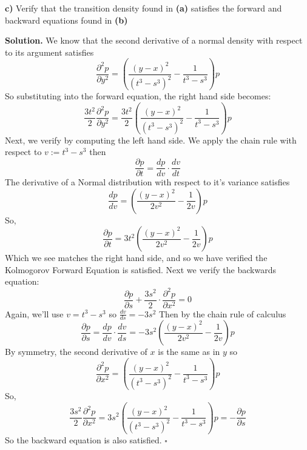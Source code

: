 \documentclass{article}
\begin{document}
\begin{tcolorbox}
[colframe=black,colback=gray!5,boxrule=0.5pt]
    \textbf{c)} Verify that the transition density found in \textbf{(a)} satisfies the forward and backward equations found in \textbf{(b)}
\end{tcolorbox}
\textbf{Solution.} We know that the second derivative of a normal density with respect to its argument satisfies 
$$\frac{\partial^2 p}{\partial y^2} = \left(\frac{(y-x)^2}{(t^3-s^3)^2} - \frac{1}{t^3 - s^3}\right)p$$
So substituting into the forward equation, the right hand side becomes:  
$$\frac{3t^2}{2} \frac{\partial^2 p}{\partial y^2} = \frac{3t^2}{2}\left(\frac{(y-x)^2}{(t^3-s^3)^2} - \frac{1}{t^3 - s^3}\right)p$$
Next, we verify by computing the left hand side. We apply the chain rule with respect to $v:=t^3-s^3$ then 
$$\frac{\partial p}{\partial t} = \frac{dp}{dv}\cdot \frac{dv}{dt}$$
The derivative of a Normal distribution with respect to it's variance satisfies 
$$\frac{dp}{dv} = \left(\frac{(y-x)^2}{2v^2} - \frac{1}{2v}\right)p$$
So,
$$\frac{\partial p}{\partial t} = 3t^2\left(\frac{(y-x)^2}{2v^2} - \frac{1}{2v}\right)p$$
Which we see matches the right hand side, and so we have verified the Kolmogorov Forward Equation is satisfied. Next we verify the backwards equation: 
$$\frac{\partial p}{\partial s} + \frac{3s^2}{2}\cdot \frac{\partial^2 p}{\partial x^2} = 0$$
Again, we'll use $v = t^3 - s^3$ so $\frac{dv}{ds} = -3s^2$
Then by the chain rule of calculus 
$$\frac{\partial p}{\partial s} = \frac{dp}{dv}\cdot \frac{dv}{ds} = -3s^2\left(\frac{(y-x)^2}{2v^2} - \frac{1}{2v}\right)p$$
By symmetry, the second derivative of $x$ is the same as in $y$ so
$$\frac{\partial^2 p}{\partial x^2} = \left(\frac{(y-x)^2}{(t^3-s^3)^2} - \frac{1}{t^3 - s^3}\right)p$$
So, 
$$\frac{3s^2}{2}\frac{\partial^2 p}{\partial x^2} = 3s^2\left(\frac{(y-x)^2}{(t^3-s^3)^2} - \frac{1}{t^3 - s^3}\right)p = -\frac{\partial p}{\partial s}$$
So the backward equation is also satisfied. $\square$

\newpage
 
\end{document}
